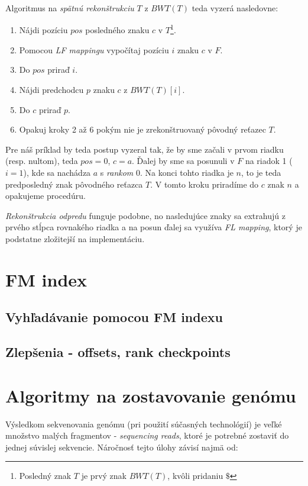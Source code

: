     Algoritmus na \emph{spätnú rekonštrukciu} $T$ z $BWT(T)$ teda vyzerá nasledovne:
    
    \begin{enumerate}
        \item{Nájdi pozíciu $pos$ posledného znaku $c$ v $T$\footnote{Posledný znak $T$ je prvý znak $BWT(T)$, kvôli pridaniu $\$$}.}
        \item{Pomocou \emph{LF mappingu} vypočítaj pozíciu $i$ znaku $c$ v $F$.}
        \item{Do $pos$ priraď $i$.}
        \item{Nájdi predchodcu $p$ znaku $c$ z $BWT(T)[i]$.}
        \item{Do $c$ priraď $p$.}
        \item{Opakuj kroky 2 až 6 pokým nie je zrekonštruovaný pôvodný reťazec $T$.}
    \end{enumerate}
    
    Pre náš príklad by teda postup vyzeral tak, že by sme začali v prvom riadku (resp. nultom), teda $pos = 0$, $c = a$. Ďalej by sme sa posunuli v $F$ na riadok 1 ($i = 1$), kde sa nachádza $a$ s \emph{rankom} 0. Na konci tohto riadka je $n$, to je teda predposledný znak pôvodného reťazca $T$. V tomto kroku priradíme do $c$ znak $n$ a opakujeme procedúru.
    
    \emph{Rekonštrukcia odpredu} funguje podobne, no nasledujúce znaky sa extrahujú z prvého stĺpca rovnakého riadka a na posun ďalej sa využíva \emph{FL mapping}, ktorý je podstatne zložitejší na implementáciu.
    
    
\section{FM index}  
    \todo{} %

    \subsection{Vyhľadávanie pomocou FM indexu}
    \todo{} %
    
    \subsection{Zlepšenia - offsets, rank checkpoints}
    \todo{} %
    
\section{Algoritmy na zostavovanie genómu}
    Výsledkom sekvenovania genómu (pri použití súčasných technológií) je veľké
    množstvo malých fragmentov - \emph{sequencing reads}, ktoré je potrebné
    zostaviť do jednej súvislej sekvencie. Náročnosť tejto úlohy závisí najmä
    od:
    
